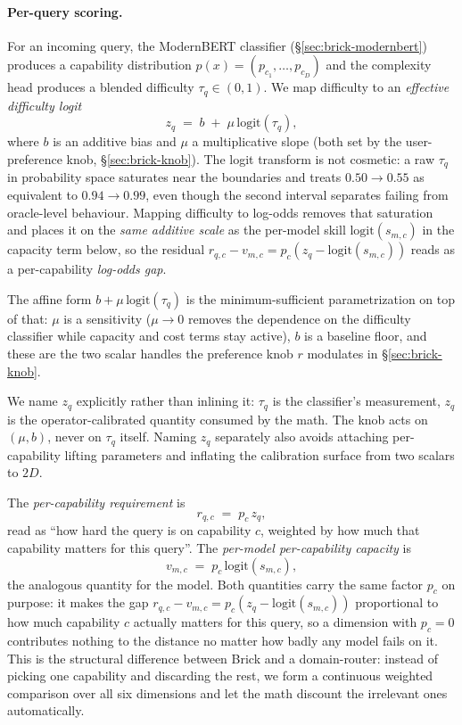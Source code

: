 \documentclass[twocolumn,10pt,a4paper]{article}
\begin{document}
\paragraph{Per-query scoring.} For an incoming query, the ModernBERT classifier (§\ref{sec:brick-modernbert}) produces a capability distribution $p(x){=}(p_{c_1},\dots,p_{c_D})$ and the complexity head produces a blended difficulty $\tau_q\in(0,1)$. We map difficulty to an \emph{effective difficulty logit}
\[
  z_q \;=\; b \;+\; \mu\,\mathrm{logit}(\tau_q),
\]
where $b$ is an additive bias and $\mu$ a multiplicative slope (both set by the user-preference knob, §\ref{sec:brick-knob}). The logit transform is not cosmetic: a raw $\tau_q$ in probability space saturates near the boundaries and treats $0.50{\to}0.55$ as equivalent to $0.94{\to}0.99$, even though the second interval separates failing from oracle-level behaviour. Mapping difficulty to log-odds removes that saturation and places it on the \emph{same additive scale} as the per-model skill $\mathrm{logit}(s_{m,c})$ in the capacity term below, so the residual $r_{q,c}{-}v_{m,c}{=}p_c(z_q{-}\mathrm{logit}(s_{m,c}))$ reads as a per-capability \emph{log-odds gap}.

The affine form $b{+}\mu\,\mathrm{logit}(\tau_q)$ is the minimum-sufficient parametrization on top of that: $\mu$ is a sensitivity ($\mu{\to}0$ removes the dependence on the difficulty classifier while capacity and cost terms stay active), $b$ is a baseline floor, and these are the two scalar handles the preference knob $r$ modulates in §\ref{sec:brick-knob}.

We name $z_q$ explicitly rather than inlining it: $\tau_q$ is the classifier's measurement, $z_q$ is the operator-calibrated quantity consumed by the math. The knob acts on $(\mu, b)$, never on $\tau_q$ itself. Naming $z_q$ separately also avoids attaching per-capability lifting parameters and inflating the calibration surface from two scalars to $2D$.

The \emph{per-capability requirement} is
\[
  r_{q,c} \;=\; p_c\,z_q,
\]
read as ``how hard the query is on capability $c$, weighted by how much that capability matters for this query''. The \emph{per-model per-capability capacity} is
\[
  v_{m,c} \;=\; p_c\,\mathrm{logit}(s_{m,c}),
\]
the analogous quantity for the model. Both quantities carry the same factor $p_c$ on purpose: it makes the gap $r_{q,c}{-}v_{m,c}{=}p_c(z_q{-}\mathrm{logit}(s_{m,c}))$ proportional to how much capability $c$ actually matters for this query, so a dimension with $p_c{=}0$ contributes nothing to the distance no matter how badly any model fails on it. This is the structural difference between Brick and a domain-router: instead of picking one capability and discarding the rest, we form a continuous weighted comparison over all six dimensions and let the math discount the irrelevant ones automatically.
\end{document}
